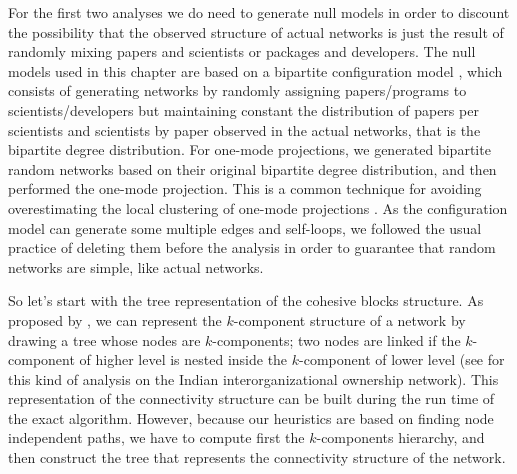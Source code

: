 For the first two analyses we do need to generate null models in order to discount the possibility that the observed structure of actual networks is just the result of randomly mixing papers and scientists or packages and developers. The null models used in this chapter are based on a bipartite configuration model \citep{newman:2003}, which consists of generating networks by randomly assigning papers/programs to scientists/developers but maintaining constant the distribution of papers per scientists and scientists by paper observed in the actual networks, that is the bipartite degree distribution. For one-mode projections, we generated bipartite random networks based on their original bipartite degree distribution, and then performed the one-mode projection. This is a common technique for avoiding overestimating the local clustering of one-mode projections \citep{uzzi:2007}. As the configuration model can generate some multiple edges and self-loops, we followed the usual practice of deleting them before the analysis in order to guarantee that random networks are simple, like actual networks.

So let's start with the tree representation of the cohesive blocks structure. As proposed by \citet{white:2004}, we can represent the $k$-component structure of a network by drawing a tree whose nodes are $k$-components; two nodes are linked if the $k$-component of higher level is nested inside the $k$-component of lower level (see \citet[1643,1651]{mani:2014} for this kind of analysis on the Indian interorganizational ownership network). This representation of the connectivity structure can be built during the run time of the exact algorithm. However, because our heuristics are based on finding node independent paths, we have to compute first the $k$-components hierarchy, and then construct the tree that represents the connectivity structure of the network.

